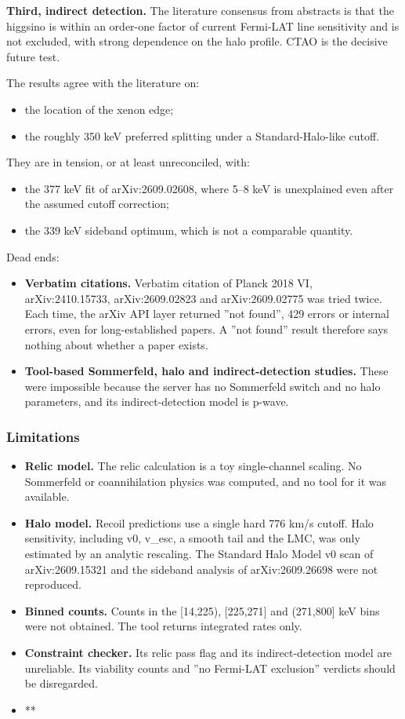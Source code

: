 \documentclass[11pt,a4paper]{article}
\begin{document}
\textbf{Third, indirect detection.} The literature consensus from abstracts is that the higgsino is within an order-one factor of current Fermi-LAT line sensitivity and is not excluded, with strong dependence on the halo profile. CTAO is the decisive future test.

The results agree with the literature on:

\begin{itemize}
  \item the location of the xenon edge;
  \item the roughly 350 keV preferred splitting under a Standard-Halo-like cutoff.
\end{itemize}
They are in tension, or at least unreconciled, with:

\begin{itemize}
  \item the 377 keV fit of arXiv:2609.02608, where 5--8 keV is unexplained even after the assumed cutoff correction;
  \item the 339 keV sideband optimum, which is not a comparable quantity.
\end{itemize}
Dead ends:

\begin{itemize}
  \item \textbf{Verbatim citations.} Verbatim citation of Planck 2018 VI, arXiv:2410.15733, arXiv:2609.02823 and arXiv:2609.02775 was tried twice. Each time, the arXiv API layer returned ''not found'', 429 errors or internal errors, even for long-established papers. A ''not found'' result therefore says nothing about whether a paper exists.
  \item \textbf{Tool-based Sommerfeld, halo and indirect-detection studies.} These were impossible because the server has no Sommerfeld switch and no halo parameters, and its indirect-detection model is p-wave.
\end{itemize}
\subsubsection*{Limitations}
\begin{itemize}
  \item \textbf{Relic model.} The relic calculation is a toy single-channel scaling. No Sommerfeld or coannihilation physics was computed, and no tool for it was available.
  \item \textbf{Halo model.} Recoil predictions use a single hard 776 km/s cutoff. Halo sensitivity, including v0, v\_esc, a smooth tail and the LMC, was only estimated by an analytic rescaling. The Standard Halo Model v0 scan of arXiv:2609.15321 and the sideband analysis of arXiv:2609.26698 were not reproduced.
  \item \textbf{Binned counts.} Counts in the [14,225), [225,271] and (271,800] keV bins were not obtained. The tool returns integrated rates only.
  \item \textbf{Constraint checker.} Its relic pass flag and its indirect-detection model are unreliable. Its viability counts and ''no Fermi-LAT exclusion'' verdicts should be disregarded.
  \item **
\end{itemize}
\end{document}
